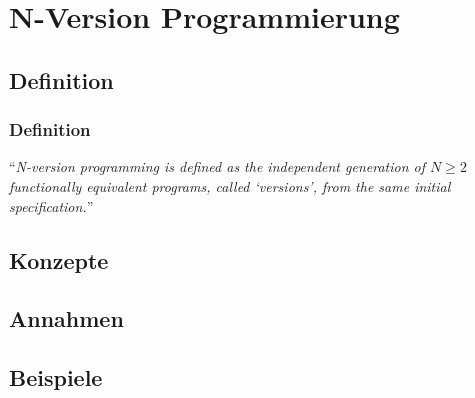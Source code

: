 \section{N-Version Programmierung}
\subsection{Definition}
%
%
\begin{frame}
	\frametitle{Definition}
	\enquote{\emph{N-version programming is defined as the independent generation of $ N \geq 2 $ functionally equivalent programs, called \enquote{versions}, from the same initial specification.}} \cite{Chen1978}

\end{frame}
%
\subsection{Konzepte}
%
\subsection{Annahmen}
%
\subsection{Beispiele}
%

